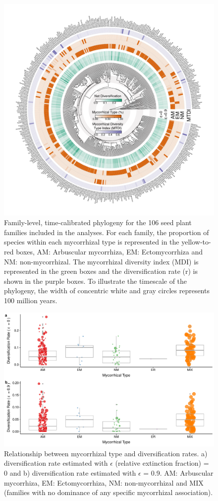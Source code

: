 \documentclass[12pt,]{article}
\begin{document}
\begin{figure}
\centering
\includegraphics{../output/tree_fig/phylo_genus_final_resized.pdf}
\caption{Family-level, time-calibrated phylogeny for the 106 seed plant
families included in the analyses. For each family, the proportion of
species within each mycorrhizal type is represented in the yellow-to-red
boxes, AM: Arbuscular mycorrhiza, EM: Ectomycorrhiza and NM:
non-mycorrhizal. The mycorrhizal diversity index (MDI) is represented in
the green boxes and the diversification rate (r) is shown in the purple
boxes. To illustrate the timescale of the phylogeny, the width of
concentric white and gray circles represents 100 million years.}
\end{figure}

\begin{figure}
\centering
\includegraphics{../output/figs/boxplots_netdiv_myctype.pdf}
\caption{Relationship between mycorrhizal type and diversification
rates. a) diversification rate estimated with \(\epsilon\) (relative
extinction fraction) = 0 and b) diversification rate estimated with
\(\epsilon\) = 0.9. AM: Arbuscular mycorrhiza, EM: Ectomycorrhiza, NM:
non-mycorrhizal and MIX (families with no dominance of any specific
mycorrhizal association).}
\end{figure}
\end{document}
